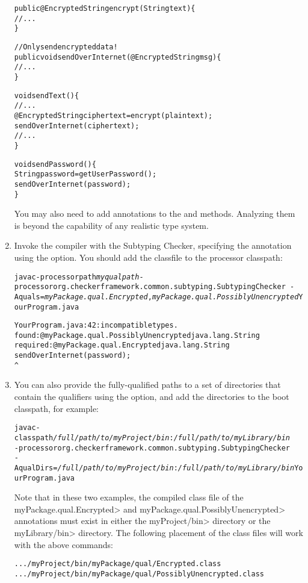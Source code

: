 \begin{enumerate}
\begin{alltt}
public @Encrypted String encrypt(String text) \{
    // ...
\}

// Only send encrypted data!
public void sendOverInternet(@Encrypted String msg) \{
    // ...
\}

void sendText() \{
    // ...
    @Encrypted String ciphertext = encrypt(plaintext);
    sendOverInternet(ciphertext);
    // ...
\}

void sendPassword() \{
    String password = getUserPassword();
    sendOverInternet(password);
\}
\end{alltt}

You may also need to add  annotations to the
 and  methods.  Analyzing them is beyond the
capability of any realistic type system.

\item
  Invoke the compiler with the Subtyping Checker, specifying the
   annotation using the  option.
  You should add the  classfile to the processor classpath:

\begin{alltt}
  javac -processorpath \textit{myqualpath} -processor org.checkerframework.common.subtyping.SubtypingChecker \
        -Aquals=\textit{myPackage.qual.Encrypted},\textit{myPackage.qual.PossiblyUnencrypted} YourProgram.java

YourProgram.java:42: incompatible types.
found   : @myPackage.qual.PossiblyUnencrypted java.lang.String
required: @myPackage.qual.Encrypted java.lang.String
    sendOverInternet(password);
                     ^
\end{alltt}

\item
You can also provide the fully-qualified paths to a set of directories
that contain the qualifiers using the \code{-AqualDirs} option, and add
the directories to the boot classpath, for example:

\begin{alltt}
  javac -classpath \textit{/full/path/to/myProject/bin}:\textit{/full/path/to/myLibrary/bin} \ttbs
        -processor org.checkerframework.common.subtyping.SubtypingChecker \ttbs
        -AqualDirs=\textit{/full/path/to/myProject/bin}:\textit{/full/path/to/myLibrary/bin} YourProgram.java
\end{alltt}

\begin{sloppypar}
Note that in these two examples, the compiled class file of the
\<myPackage.qual.Encrypted> and \<myPackage.qual.PossiblyUnencrypted> annotations
must exist in either the \<myProject/bin> directory or the \<myLibrary/bin>
directory. The following placement of the class files will work with the above
commands:
\end{sloppypar}

\begin{alltt}
  .../myProject/bin/myPackage/qual/Encrypted.class
  .../myProject/bin/myPackage/qual/PossiblyUnencrypted.class
\end{alltt}

\end{enumerate}

